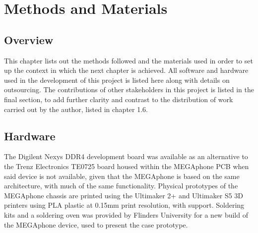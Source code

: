 
\chapter{Methods and Materials} %

\label{Chapter3} %


\section{Overview}
This chapter lists out the methods followed and the materials used in order to set up the context in which the next chapter is achieved.
All software and hardware used in the development of this project is listed here along with details on outsourcing.
The contributions of other stakeholders in this project is listed in the final section, to add further clarity and contrast to the distribution of work carried out by the author, listed in chapter 1.6.


\section{Hardware}

The Digilent Nexys DDR4 development board was available as an alternative to the Trenz Electronics TE0725 board housed within the MEGAphone PCB when said device is not available, given that the MEGAphone is based on the same architecture, with much of the same functionality.
Physical prototypes of the MEGAphone chassis are printed using the Ultimaker 2+ and Ultimaker S5 3D printers using PLA plastic at 0.15mm print resolution, with support.
Soldering kits and a soldering oven was provided by Flinders University for a new build of the MEGAphone device, used to present the case prototype.


